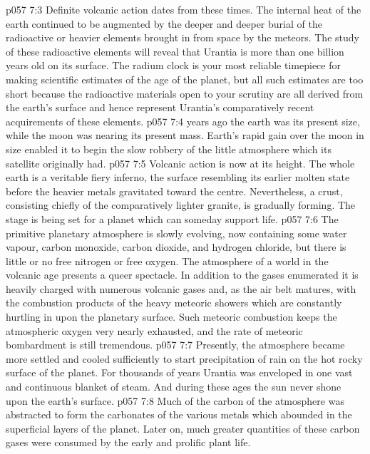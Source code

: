 \vs p057 7:3 Definite volcanic action dates from these times. The internal heat of the earth continued to be augmented by the deeper and deeper burial of the radioactive or heavier elements brought in from space by the meteors. The study of these radioactive elements will reveal that Urantia is more than one billion years old on its surface. The radium clock is your most reliable timepiece for making scientific estimates of the age of the planet, but all such estimates are too short because the radioactive materials open to your scrutiny are all derived from the earth’s surface and hence represent Urantia’s comparatively recent acquirements of these elements.
\vs p057 7:4 \pc {} years ago the earth was  its present size, while the moon was nearing its present mass. Earth’s rapid gain over the moon in size enabled it to begin the slow robbery of the little atmosphere which its satellite originally had.
\vs p057 7:5 Volcanic action is now at its height. The whole earth is a veritable fiery inferno, the surface resembling its earlier molten state before the heavier metals gravitated toward the centre.  Nevertheless, a crust, consisting chiefly of the comparatively lighter granite, is gradually forming. The stage is being set for a planet which can someday support life.
\vs p057 7:6 \pc The primitive planetary atmosphere is slowly evolving, now containing some water vapour, carbon monoxide, carbon dioxide, and hydrogen chloride, but there is little or no free nitrogen or free oxygen. The atmosphere of a world in the volcanic age presents a queer spectacle. In addition to the gases enumerated it is heavily charged with numerous volcanic gases and, as the air belt matures, with the combustion products of the heavy meteoric showers which are constantly hurtling in upon the planetary surface. Such meteoric combustion keeps the atmospheric oxygen very nearly exhausted, and the rate of meteoric bombardment is still tremendous.
\vs p057 7:7 \pc Presently, the atmosphere became more settled and cooled sufficiently to start precipitation of rain on the hot rocky surface of the planet. For thousands of years Urantia was enveloped in one vast and continuous blanket of steam. And during these ages the sun never shone upon the earth’s surface.
\vs p057 7:8 Much of the carbon of the atmosphere was abstracted to form the carbonates of the various metals which abounded in the superficial layers of the planet. Later on, much greater quantities of these carbon gases were consumed by the early and prolific plant life.

